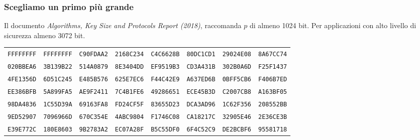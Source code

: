 \documentclass[]{beamer}
\begin{document}
\begin{frame}
\frametitle{Scegliamo un primo pi\`u grande}

Il documento 
{\em Algorithms, Key Size and Protocols Report (2018)},
raccomanda $p$ di almeno 1024 bit. Per applicazioni con alto
livello di sicurezza almeno 3072 bit.



\begin{tabular}{rrrrrrrr}
{\tiny {\color{olive}\tt FFFFFFFF}} & {\tiny \color{olive}\tt FFFFFFFF} & {\tiny \color{olive}\tt C90FDAA2} & {\tiny \color{olive}\tt 2168C234} & {\tiny \color{olive}\tt C4C6628B} & {\tiny \color{olive}\tt 80DC1CD1} & {\tiny \color{olive}\tt 29024E08} & {\tiny \color{olive}\tt 8A67CC74} \\
{\tiny \color{olive}\tt 020BBEA6} & {\tiny \color{olive}\tt 3B139B22} & {\tiny \color{olive}\tt 514A0879} & {\tiny \color{olive}\tt 8E3404DD} & {\tiny \color{olive}\tt EF9519B3} & {\tiny \color{olive}\tt CD3A431B} & {\tiny \color{olive}\tt 302B0A6D} & {\tiny \color{olive}\tt F25F1437} \\
{\tiny \color{olive}\tt 4FE1356D} & {\tiny \color{olive}\tt 6D51C245} & {\tiny \color{olive}\tt E485B576} & {\tiny \color{olive}\tt 625E7EC6} & {\tiny \color{olive}\tt F44C42E9} & {\tiny \color{olive}\tt A637ED6B} & {\tiny \color{olive}\tt 0BFF5CB6} & {\tiny \color{olive}\tt F406B7ED} \\
{\tiny \color{olive}\tt EE386BFB} & {\tiny \color{olive}\tt 5A899FA5} & {\tiny \color{olive}\tt AE9F2411} & {\tiny \color{olive}\tt 7C4B1FE6} & {\tiny \color{olive}\tt 49286651} & {\tiny \color{olive}\tt ECE45B3D} & {\tiny \color{olive}\tt C2007CB8} & {\tiny \color{olive}\tt A163BF05} \\
{\tiny \color{olive}\tt 98DA4836} & {\tiny \color{olive}\tt 1C55D39A} & {\tiny \color{olive}\tt 69163FA8} & {\tiny \color{olive}\tt FD24CF5F} & {\tiny \color{olive}\tt 83655D23} & {\tiny \color{olive}\tt DCA3AD96} & {\tiny \color{olive}\tt 1C62F356} & {\tiny \color{olive}\tt 208552BB} \\
{\tiny \color{olive}\tt 9ED52907} & {\tiny \color{olive}\tt 7096966D} & {\tiny \color{olive}\tt 670C354E} & {\tiny \color{olive}\tt 4ABC9804} & {\tiny \color{olive}\tt F1746C08} & {\tiny \color{olive}\tt CA18217C} & {\tiny \color{olive}\tt 32905E46} & {\tiny \color{olive}\tt 2E36CE3B} \\
{\tiny \color{olive}\tt E39E772C} & {\tiny \color{olive}\tt 180E8603} & {\tiny \color{olive}\tt 9B2783A2} & {\tiny \color{olive}\tt EC07A28F} & {\tiny \color{olive}\tt B5C55DF0} & {\tiny \color{olive}\tt 6F4C52C9} & {\tiny \color{olive}\tt DE2BCBF6} & {\tiny \color{olive}\tt 95581718} \\

\end{tabular}
\end{frame}
\end{document}
